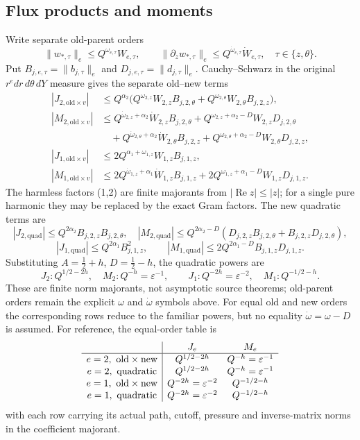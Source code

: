 \subsection{Flux products and moments}
Write separate old-parent orders
\[
\|w_{*,\tau}\|_e\le Q^{\omega_{e,\tau}}W_{e,\tau},\qquad
\|\partial_zw_{*,\tau}\|_e\le Q^{\dot\omega_{e,\tau}}\dot W_{e,\tau},
\quad \tau\in\{z,\theta\}.
\]
Put \(B_{j,e,\tau}=\|b_{j,\tau}\|_e\) and
\(D_{j,e,\tau}=\|d_{j,\tau}\|_e\).  Cauchy--Schwarz in the original
\(r^e dr\,d\theta\,dY\) measure gives the separate old--new terms
\[
\begin{aligned}
|J_{2,\mathrm{old}\times v}|&\le Q^{\alpha_2}\bigl(Q^{\omega_{2,z}}W_{2,z}B_{j,2,\theta}
 +Q^{\omega_{2,\theta}}W_{2,\theta}B_{j,2,z}\bigr),\\
|M_{2,\mathrm{old}\times v}|&\le Q^{\dot\omega_{2,z}+\alpha_2}\dot W_{2,z}B_{j,2,\theta}
 +Q^{\omega_{2,z}+\alpha_2-D}W_{2,z}D_{j,2,\theta}\\
&\quad +Q^{\dot\omega_{2,\theta}+\alpha_2}\dot W_{2,\theta}B_{j,2,z}
 +Q^{\omega_{2,\theta}+\alpha_2-D}W_{2,\theta}D_{j,2,z},\\
|J_{1,\mathrm{old}\times v}|&\le 2Q^{\alpha_1+\omega_{1,z}}W_{1,z}B_{j,1,z},\\
|M_{1,\mathrm{old}\times v}|&\le 2Q^{\dot\omega_{1,z}+\alpha_1}\dot W_{1,z}B_{j,1,z}
 +2Q^{\omega_{1,z}+\alpha_1-D}W_{1,z}D_{j,1,z}.
\end{aligned}
\]
The harmless factors (1,2) are finite majorants from
\(|\operatorname{Re}z|\le|z|\); for a single pure harmonic they may be
replaced by the exact Gram factors.  The new quadratic terms are
\[
|J_{2,\mathrm{quad}}|\le Q^{2\alpha_2}B_{j,2,z}B_{j,2,\theta},\quad
|M_{2,\mathrm{quad}}|\le Q^{2\alpha_2-D}(D_{j,2,z}B_{j,2,\theta}+B_{j,2,z}D_{j,2,\theta}),
\]
\[
|J_{1,\mathrm{quad}}|\le Q^{2\alpha_1}B_{j,1,z}^2,\qquad
|M_{1,\mathrm{quad}}|\le 2Q^{2\alpha_1-D}B_{j,1,z}D_{j,1,z}.
\]
Substituting \(A=\tfrac12+h\), \(D=\tfrac12-h\), the quadratic powers are
\[
J_2:Q^{1/2-2h},\quad M_2:Q^{-h}=\varepsilon^{-1},\qquad
J_1:Q^{-2h}=\varepsilon^{-2},\quad M_1:Q^{-1/2-h}.
\]
These are finite norm majorants, not asymptotic source theorems; old-parent
orders remain the explicit \(\omega\) and \(\dot\omega\) symbols above.
For equal old and new orders the corresponding rows reduce to the familiar
powers, but no equality \(\dot\omega=\omega-D\) is assumed.
For reference, the equal-order table is
\[
\begin{array}{c|cc}
 &J_e&M_e\\ \hline
e=2,\ {\rm old\times new}&Q^{1/2-2h}&Q^{-h}=\varepsilon^{-1}\\
e=2,\ {\rm quadratic}&Q^{1/2-2h}&Q^{-h}=\varepsilon^{-1}\\
e=1,\ {\rm old\times new}&Q^{-2h}=\varepsilon^{-2}&Q^{-1/2-h}\\
e=1,\ {\rm quadratic}&Q^{-2h}=\varepsilon^{-2}&Q^{-1/2-h}
\end{array}
\]
with each row carrying its actual path, cutoff, pressure and inverse-matrix
norms in the coefficient majorant.

